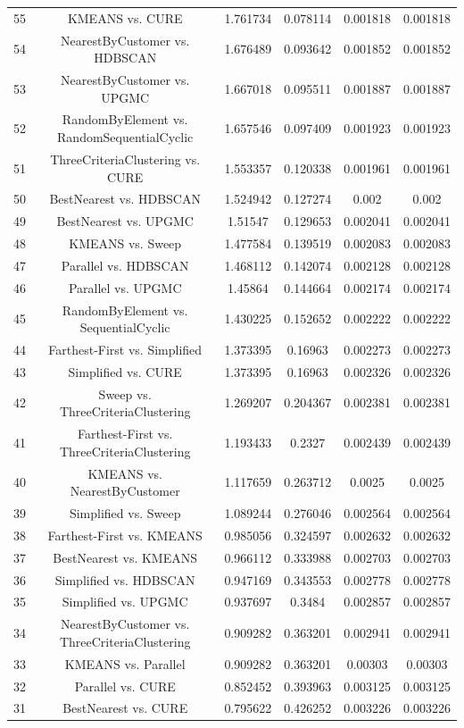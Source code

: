 \documentclass[a4paper,10pt]{article}
\begin{document}
\begin{landscape}
\begin{table}[!htp]
\begin{tabular}{cccccc}
55&KMEANS vs. CURE&1.761734&0.078114&0.001818&0.001818\\
54&NearestByCustomer vs. HDBSCAN&1.676489&0.093642&0.001852&0.001852\\
53&NearestByCustomer vs. UPGMC&1.667018&0.095511&0.001887&0.001887\\
52&RandomByElement vs. RandomSequentialCyclic&1.657546&0.097409&0.001923&0.001923\\
51&ThreeCriteriaClustering vs. CURE&1.553357&0.120338&0.001961&0.001961\\
50&BestNearest vs. HDBSCAN&1.524942&0.127274&0.002&0.002\\
49&BestNearest vs. UPGMC&1.51547&0.129653&0.002041&0.002041\\
48&KMEANS vs. Sweep&1.477584&0.139519&0.002083&0.002083\\
47&Parallel vs. HDBSCAN&1.468112&0.142074&0.002128&0.002128\\
46&Parallel vs. UPGMC&1.45864&0.144664&0.002174&0.002174\\
45&RandomByElement vs. SequentialCyclic&1.430225&0.152652&0.002222&0.002222\\
44&Farthest-First vs. Simplified&1.373395&0.16963&0.002273&0.002273\\
43&Simplified vs. CURE&1.373395&0.16963&0.002326&0.002326\\
42&Sweep vs. ThreeCriteriaClustering&1.269207&0.204367&0.002381&0.002381\\
41&Farthest-First vs. ThreeCriteriaClustering&1.193433&0.2327&0.002439&0.002439\\
40&KMEANS vs. NearestByCustomer&1.117659&0.263712&0.0025&0.0025\\
39&Simplified vs. Sweep&1.089244&0.276046&0.002564&0.002564\\
38&Farthest-First vs. KMEANS&0.985056&0.324597&0.002632&0.002632\\
37&BestNearest vs. KMEANS&0.966112&0.333988&0.002703&0.002703\\
36&Simplified vs. HDBSCAN&0.947169&0.343553&0.002778&0.002778\\
35&Simplified vs. UPGMC&0.937697&0.3484&0.002857&0.002857\\
34&NearestByCustomer vs. ThreeCriteriaClustering&0.909282&0.363201&0.002941&0.002941\\
33&KMEANS vs. Parallel&0.909282&0.363201&0.00303&0.00303\\
32&Parallel vs. CURE&0.852452&0.393963&0.003125&0.003125\\
31&BestNearest vs. CURE&0.795622&0.426252&0.003226&0.003226\\

\end{tabular}
\end{table}
\end{landscape}
\end{document}
